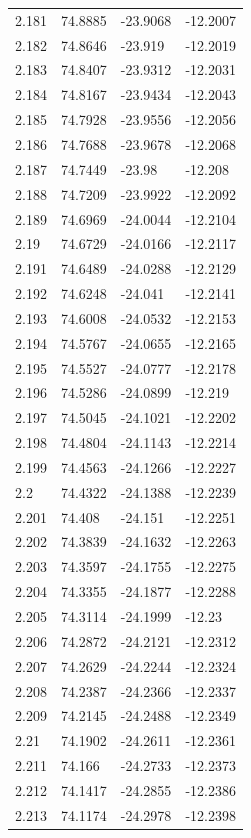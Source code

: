 \begin{tabular}{llll}
2.181 & 74.8885 & -23.9068 & -12.2007 \\
2.182 & 74.8646 & -23.919 & -12.2019 \\
2.183 & 74.8407 & -23.9312 & -12.2031 \\
2.184 & 74.8167 & -23.9434 & -12.2043 \\
2.185 & 74.7928 & -23.9556 & -12.2056 \\
2.186 & 74.7688 & -23.9678 & -12.2068 \\
2.187 & 74.7449 & -23.98 & -12.208 \\
2.188 & 74.7209 & -23.9922 & -12.2092 \\
2.189 & 74.6969 & -24.0044 & -12.2104 \\
2.19 & 74.6729 & -24.0166 & -12.2117 \\
2.191 & 74.6489 & -24.0288 & -12.2129 \\
2.192 & 74.6248 & -24.041 & -12.2141 \\
2.193 & 74.6008 & -24.0532 & -12.2153 \\
2.194 & 74.5767 & -24.0655 & -12.2165 \\
2.195 & 74.5527 & -24.0777 & -12.2178 \\
2.196 & 74.5286 & -24.0899 & -12.219 \\
2.197 & 74.5045 & -24.1021 & -12.2202 \\
2.198 & 74.4804 & -24.1143 & -12.2214 \\
2.199 & 74.4563 & -24.1266 & -12.2227 \\
2.2 & 74.4322 & -24.1388 & -12.2239 \\
2.201 & 74.408 & -24.151 & -12.2251 \\
2.202 & 74.3839 & -24.1632 & -12.2263 \\
2.203 & 74.3597 & -24.1755 & -12.2275 \\
2.204 & 74.3355 & -24.1877 & -12.2288 \\
2.205 & 74.3114 & -24.1999 & -12.23 \\
2.206 & 74.2872 & -24.2121 & -12.2312 \\
2.207 & 74.2629 & -24.2244 & -12.2324 \\
2.208 & 74.2387 & -24.2366 & -12.2337 \\
2.209 & 74.2145 & -24.2488 & -12.2349 \\
2.21 & 74.1902 & -24.2611 & -12.2361 \\
2.211 & 74.166 & -24.2733 & -12.2373 \\
2.212 & 74.1417 & -24.2855 & -12.2386 \\
2.213 & 74.1174 & -24.2978 & -12.2398 \\

\end{tabular}

